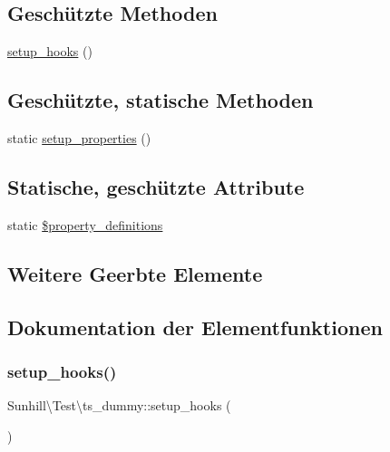 \subsection*{Geschützte Methoden}
\begin{DoxyCompactItemize}
\item 
\hyperlink{classSunhill_1_1Test_1_1ts__dummy_adec05c30433290f4c34b2932e8af1b67}{setup\+\_\+hooks} ()
\end{DoxyCompactItemize}
\subsection*{Geschützte, statische Methoden}
\begin{DoxyCompactItemize}
\item 
static \hyperlink{classSunhill_1_1Test_1_1ts__dummy_a59939349529ffcb8f590ae25ffae6774}{setup\+\_\+properties} ()
\end{DoxyCompactItemize}
\subsection*{Statische, geschützte Attribute}
\begin{DoxyCompactItemize}
\item 
static \hyperlink{classSunhill_1_1Test_1_1ts__dummy_a3aa9bc263138a80a341fb5ed8d4fb42f}{\$property\+\_\+definitions}
\end{DoxyCompactItemize}
\subsection*{Weitere Geerbte Elemente}


\subsection{Dokumentation der Elementfunktionen}
\mbox{\label{classSunhill_1_1Test_1_1ts__dummy_adec05c30433290f4c34b2932e8af1b67}} 
\subsubsection{\texorpdfstring{setup\+\_\+hooks()}{setup\_hooks()}}
{\footnotesize\ttfamily Sunhill\textbackslash{}\+Test\textbackslash{}ts\+\_\+dummy\+::setup\+\_\+hooks (\begin{DoxyParamCaption}{ }\end{DoxyParamCaption})\hspace{0.3cm}{\ttfamily [protected]}}

